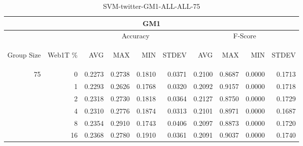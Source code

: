 \begin{center}
\begin{table}[htbp] 
 \begin{center}
\begin{tabular}{ | r | r | r | r | r | r | r | r | r | r |}
\hline
\multicolumn{10}{|c|}{GM1}\\
\hline
 & & \multicolumn{4}{|c|}{Accuracy} & \multicolumn{4}{|c|}{F-Score}\\ \cline{3-10}
\begin{sideways}Group Size\end{sideways} & \begin{sideways}Web1T \%\end{sideways} & \begin{sideways}AVG\end{sideways} & \begin{sideways}MAX\end{sideways} & \begin{sideways}MIN\end{sideways} & \begin{sideways}STDEV\end{sideways} & \begin{sideways}AVG\end{sideways} & \begin{sideways}MAX\end{sideways} & \begin{sideways}MIN\end{sideways} & \begin{sideways}STDEV\end{sideways}\\
\hline
\multirow{5}{*}{75}
 & 0 & 0.2273 & 0.2738 & 0.1810 & 0.0371 & 0.2100 & 0.8687 & 0.0000 & 0.1713\\ \cline{2-10}
 & 1 & 0.2293 & 0.2626 & 0.1768 & 0.0320 & 0.2092 & 0.9157 & 0.0000 & 0.1718\\ \cline{2-10}
 & 2 & 0.2318 & 0.2730 & 0.1818 & 0.0364 & 0.2127 & 0.8750 & 0.0000 & 0.1729\\ \cline{2-10}
 & 4 & 0.2310 & 0.2776 & 0.1874 & 0.0313 & 0.2101 & 0.8971 & 0.0000 & 0.1687\\ \cline{2-10}
 & 8 & 0.2354 & 0.2910 & 0.1743 & 0.0406 & 0.2097 & 0.8873 & 0.0000 & 0.1720\\ \cline{2-10}
 & 16 & 0.2368 & 0.2780 & 0.1910 & 0.0361 & 0.2091 & 0.9037 & 0.0000 & 0.1740\\ \cline{2-10}
\hline
\end{tabular}
\caption{SVM-twitter-GM1-ALL-ALL-75}
\label{table:SVM-twitter-GM1-ALL-ALL-75}
\end{center}
 \end{table}
\end{center}

